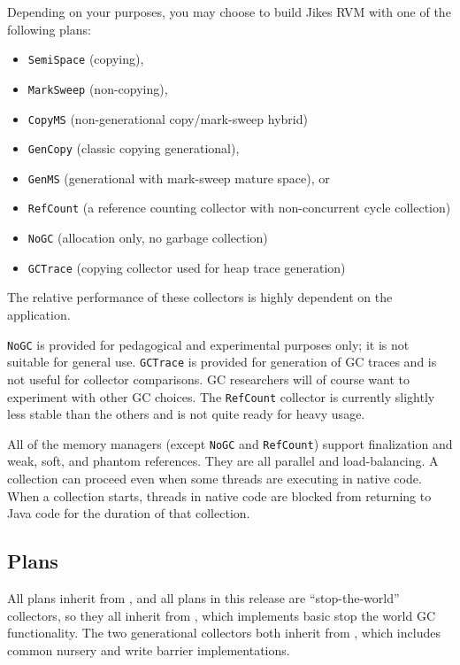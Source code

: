 Depending on your purposes, you may choose to build Jikes RVM with one
of the following plans:
\begin{itemize}
\item \texttt{SemiSpace} (copying),
\item \texttt{MarkSweep} (non-copying),
\item \texttt{CopyMS} (non-generational copy/mark-sweep hybrid)
\item \texttt{GenCopy} (classic copying generational),
\item \texttt{GenMS} (generational with mark-sweep mature space), or
\item \texttt{RefCount} (a reference counting collector with non-concurrent cycle collection)
\item \texttt{NoGC} (allocation only, no garbage collection)
\item \texttt{GCTrace} (copying collector used for heap trace generation)
\end{itemize}
The relative performance of these collectors is highly dependent on
the application. 

\texttt{NoGC} is provided for pedagogical and
experimental purposes only; it is not suitable for general use.
\texttt{GCTrace} is provided for generation of GC traces and is not 
useful for collector comparisons.
GC researchers will of course want to experiment with other GC choices.
The \texttt{RefCount} collector is currently slightly less stable than
the others and is not quite ready for heavy usage.

All of the memory managers (except \texttt{NoGC} and \texttt{RefCount}) 
support finalization and weak, soft, and phantom references.  They are all parallel 
and load-balancing.  A collection can proceed even when some threads are
executing in native code. When a collection starts, threads in native
code are blocked from returning to Java code for the duration of that
collection.

\subsection{Plans}%
        \label{sssec:plans}%

%
All plans inherit from ,
and all plans in this release are ``stop-the-world'' collectors, so
they all inherit from
%
, which implements
basic stop the world GC functionality.  The two generational
collectors both inherit from
%
, which includes
common nursery and write barrier implementations.

